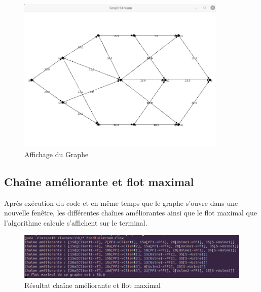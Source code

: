 \documentclass{article}
\begin{document}
\begin{figure}[!ht]
    \center
    \includegraphics[width=10cm]{./images/Graphe.png}
    \caption{Affichage du Graphe}
\end{figure}

\subsection{Chaîne améliorante et flot maximal}

Après exécution du code et en même temps que le graphe s'ouvre dans une nouvelle fenêtre, les différentes chaînes améliorantes ainsi que le flot maximal que l'algorithme calcule s'affichent sur le terminal.

\begin{figure}[!ht]
    \center
    \includegraphics[width=12cm]{./images/Terminal.png}
    \caption{Résultat chaîne améliorante et flot maximal}
\end{figure}
\end{document}
